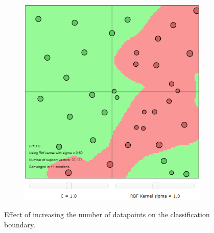 \documentclass{article}
\begin{document}
\begin{figure}[h]
\begin{subfigure}[b]{0.3\textwidth}
                 \includegraphics[width=\textwidth]{Assignment 1/figures/RBF_many_datapoints.png}
                 \label{fig:many_datapoints}
             \end{subfigure}
             \hspace{0.15\textwidth}
            \caption{Effect of increasing the number of datapoints on the classification boundary.}
        \end{figure}
    
\end{document}
